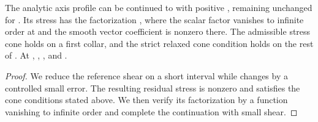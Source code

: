 \begin{proposition}\label{prop:B.5}
The analytic axis profile can be continued to  with positive
, remaining unchanged for . Its stress has the factorization
, where the scalar factor  vanishes to infinite order at
 and the smooth vector coefficient  is nonzero there. The admissible stress
cone holds on a first collar, and the strict relaxed cone condition holds on the rest of
\NSi{NS-F-P151-046}{(X_0,X_i]}. At ,
, , and .
\end{proposition}
\begin{proof}
We reduce the reference shear on a short interval while  changes by a controlled
small error. The resulting residual stress is nonzero and satisfies the cone conditions stated
above. We then verify its factorization by a function vanishing to infinite order and complete
the continuation with small shear.


\end{proof}
